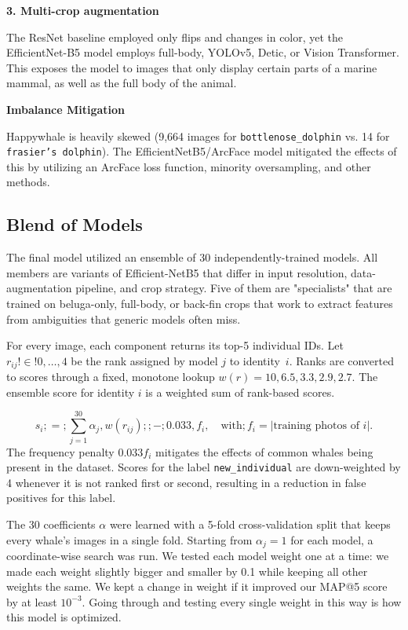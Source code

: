 \documentclass[twocolumn]{article}
\begin{document}
\textbf{3. Multi-crop augmentation}

The ResNet baseline employed only flips and changes in color, yet the EfficientNet-B5 model employs full-body, YOLOv5, Detic, or Vision Transformer. This exposes the model to images that only display certain parts of a marine mammal, as well as the full body of the animal. 

\textbf{Imbalance Mitigation}

Happywhale is heavily skewed (9,664 images for \texttt{bottlenose_dolphin} vs. 14 for \texttt{frasier's dolphin}). The EfficientNetB5/ArcFace model mitigated the effects of this by utilizing an ArcFace loss function, minority oversampling, and other methods. 

\subsection{Blend of Models}

The final model utilized an ensemble of 30 independently-trained models. All members are variants of Efficient-NetB5 that differ in input resolution, data-augmentation pipeline, and crop strategy. Five of them are "specialists" that are trained on beluga-only, full-body, or back-fin crops that work to extract features from ambiguities that generic models often miss.

For every image, each component returns its top-5 individual IDs. Let $r_{ij}!\in!{0,\dots,4}$ be the rank assigned by model $j$ to identity~$i$. Ranks are converted to scores through a fixed, monotone lookup $w(r)={10,6.5,3.3,2.9,2.7}$. The ensemble score for identity $i$ is a weighted sum of rank-based scores.

\begin{equation}
s_i;=;\sum_{j=1}^{30} \alpha_j,w(r_{ij});;{-};0.033,f_i,\quad\text{with};f_i=|{\text{training photos of }i}|.
\end{equation}
The frequency penalty $0.033 f_i$ mitigates the effects of common whales being present in the dataset. Scores for the label \texttt{new_individual} are down-weighted by 4 whenever it is not ranked first or second, resulting in a reduction in false positives for this label. 

The 30 coefficients ${\alpha}$ were learned with a 5-fold cross-validation split that keeps every whale's images in a single fold. Starting from $\alpha_j = 1$ for each model, a coordinate-wise search was run. We tested each model weight one at a time: we made each weight slightly bigger and smaller by 0.1 while keeping all other weights the same. We kept a change in weight if it improved our MAP@5 score by at least $10^{-3}$. Going through and testing every single weight in this way is how this model is optimized.
\end{document}
